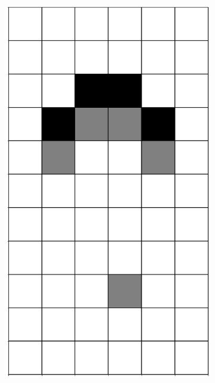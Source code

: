 \documentclass[12pt]{article}
\numberwithin{figure}{section} %
\begin{document}
\begin{figure}[H]
\begin{subfigure}{0.19\textwidth}
     		\includegraphics[width=\linewidth]{Section4/2.3}
   	\end{subfigure}
        \begin{subfigure}{0.19\textwidth}
     		\centering

\end{subfigure}
\end{figure}
\end{document}
